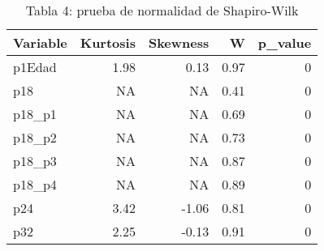 \begin{table}

\caption{Tabla 4: prueba de normalidad de Shapiro-Wilk}
\centering
\begin{tabular}[t]{l|r|r|r|r}
\hline
Variable & Kurtosis & Skewness & W & p\_value\\
\hline
p1Edad & 1.98 & 0.13 & 0.97 & 0\\
\hline
p18 & NA & NA & 0.41 & 0\\
\hline
p18\_p1 & NA & NA & 0.69 & 0\\
\hline
p18\_p2 & NA & NA & 0.73 & 0\\
\hline
p18\_p3 & NA & NA & 0.87 & 0\\
\hline
p18\_p4 & NA & NA & 0.89 & 0\\
\hline
p24 & 3.42 & -1.06 & 0.81 & 0\\
\hline
p32 & 2.25 & -0.13 & 0.91 & 0\\
\hline
\end{tabular}
\end{table}

